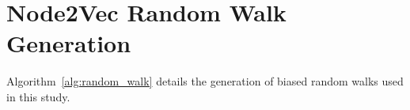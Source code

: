 \documentclass[pdflatex,sn-mathphys-num,iicol]{sn-jnl}%
\theoremstyle{thmstyleone}%
\theoremstyle{thmstyletwo}%
\theoremstyle{thmstylethree}%
\begin{document}
%
%
%
%
%
%
%


%


\appendix
\section{Node2Vec Random Walk Generation}
\label{app:random_walk}

Algorithm~\ref{alg:random_walk} details the generation of biased random walks used in this study.
\end{document}
